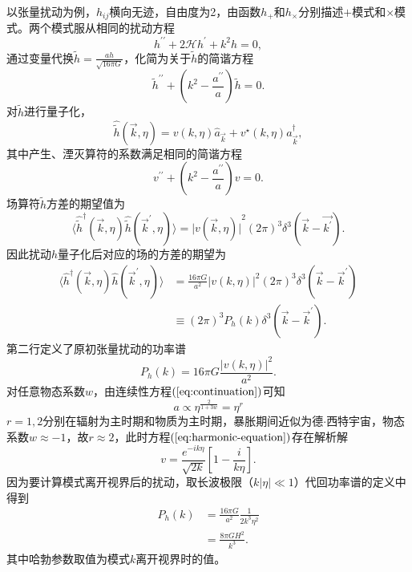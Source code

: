 以张量扰动为例，$h_{ij}$横向无迹，自由度为2，由函数$h_{+}$和$h_{\times}$分别描述$+$模式和$\times$模式。两个模式服从相同的扰动方程
\begin{equation}
  \label{eq:tensor-perturbation-equation}
  h^{\prime\prime}+ 2\mathcal{H}h^\prime+k^2h = 0,
\end{equation}
通过变量代换$\tilde{h}=\frac{ah}{\sqrt{16\pi G}}$，化简为关于$\tilde{h}$的简谐方程
\begin{equation}
  \tilde{h}^{\prime\prime}+(k^2-\frac{a^{\prime\prime}}{a})\tilde{h} =0. 
\end{equation}
对$\tilde{h}$进行量子化，
\begin{equation}
  \hat{\tilde{h}}(\vec{k},\eta)=v(k, \eta)\hat{a}_{\vec{k}}+v^{\star}(k,
  \eta)a^{\dagger}_{\vec{k}},
\end{equation}
其中产生、湮灭算符的系数满足相同的简谐方程
\begin{equation}
  \label{eq:harmonic-equation}
  v^{\prime\prime}+(k^2-\frac{a^{\prime\prime}}{a})v =0. 
\end{equation}
场算符$\tilde{h}$方差的期望值为
\begin{equation}
  \langle \hat{\tilde{h}}^{\dagger}(\vec{k},
  \eta)\hat{\tilde{h}}(\vec{k}^{\prime},\eta)\rangle={\lvert
  v(\vec{k},\eta)\rvert}^2 {\left(2\pi
\right)}^3\delta^{3}(\vec{k}-\vec{k^\prime}).
\end{equation}
因此扰动$h$量子化后对应的场的方差的期望为
\begin{align}
  \langle \hat{h}^{\dagger}(\vec{k},\eta)\hat{h}(\vec{k}^{\prime},\eta) \rangle
  &= \frac{16\pi G}{a^2}{\lvert
  v(k,\eta)\rvert}^2{\left(2\pi\right)}^3\delta^3(\vec{k}-\vec{k}^{\prime})
  \\
  &\equiv {\left(2\pi\right)}^3 P_h(k)\delta^3(\vec{k}-\vec{k}^\prime).
\end{align}
第二行定义了原初张量扰动的功率谱
\begin{equation}
  \label{eq:tensor-primodial-pertubation} 
  P_h(k) = 16\pi G \frac{{\lvert v(k,\eta)\rvert}^2}{a^2}.
\end{equation}
对任意物态系数$w$，由连续性方程$(\ref{eq:continuation})$可知
\begin{equation}
  a \propto \eta^{\frac{2}{1+3w}} = \eta^{r} 
\end{equation}
$r=1,2$分别在辐射为主时期和物质为主时期，暴胀期间近似为德$\cdot$西特宇宙，物态系数$w\approx
-1$，故$r\approx 2$，此时方程$(\ref{eq:harmonic-equation})$存在解析解
\begin{equation}
  \label{eq:solution-for-harmonic-equation}
  v = \frac{e^{-ik\eta}}{\sqrt{2k}}{\left[1-\frac{i}{k\eta}\right]}.
\end{equation}
因为要计算模式离开视界后的扰动，取长波极限（$k\lvert \eta\rvert \ll
1$）代回功率谱的定义中得到
\begin{align}
  \label{eq:tensor-power-spectrum}
  P_h(k)&= \frac{16\pi G}{a^2}\frac{1}{2k^3\eta^2} \\
        &= \frac{8\pi GH^2}{k^3}.
\end{align}
其中哈勃参数取值为模式$k$离开视界时的值。


